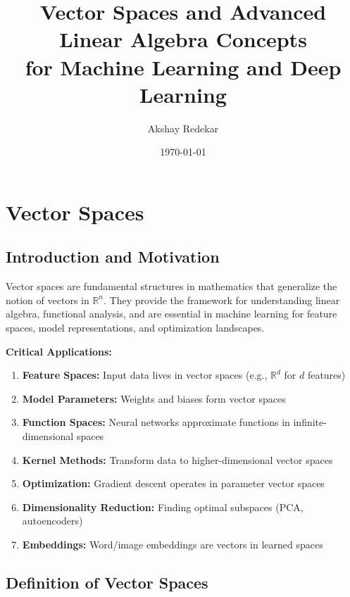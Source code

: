 \documentclass[12pt,a4paper]{article}
\title{\textbf{Vector Spaces and Advanced Linear Algebra Concepts \\ for Machine Learning and Deep Learning}}
\author{Akshay Redekar}
\date{\today}
\theoremstyle{definition}
\begin{document}
\maketitle
\tableofcontents
\newpage

\section{Vector Spaces}

\subsection{Introduction and Motivation}

Vector spaces are fundamental structures in mathematics that generalize the notion of vectors in $\mathbb{R}^n$. They provide the framework for understanding linear algebra, functional analysis, and are essential in machine learning for feature spaces, model representations, and optimization landscapes.

\begin{tcolorbox}[enhanced,breakable,colback=blue!5!white,colframe=blue!75!black,title=Why Vector Spaces in ML/DL?]
\textbf{Critical Applications:}
\begin{enumerate}
    \item \textbf{Feature Spaces:} Input data lives in vector spaces (e.g., $\mathbb{R}^d$ for $d$ features)
    \item \textbf{Model Parameters:} Weights and biases form vector spaces
    \item \textbf{Function Spaces:} Neural networks approximate functions in infinite-dimensional spaces
    \item \textbf{Kernel Methods:} Transform data to higher-dimensional vector spaces
    \item \textbf{Optimization:} Gradient descent operates in parameter vector spaces
    \item \textbf{Dimensionality Reduction:} Finding optimal subspaces (PCA, autoencoders)
    \item \textbf{Embeddings:} Word/image embeddings are vectors in learned spaces
\end{enumerate}
\end{tcolorbox}

\subsection{Definition of Vector Spaces}
\end{document}
